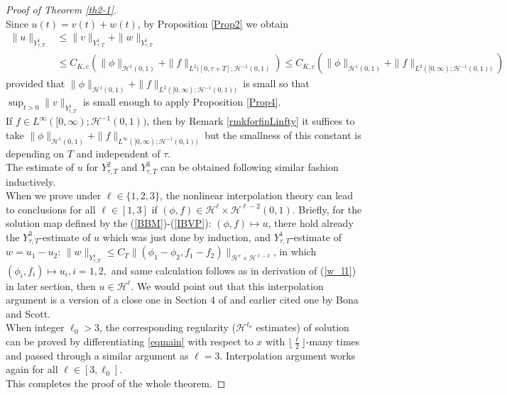 \documentclass[10pt,a4paper,final]{article}
\numberwithin{equation}{section}
\newcommand{\cH}{\mathcal{H}}
\begin{document}
\begin{proof}[Proof of Theorem \ref{th2-1}]\ \\
    Since $u(t)=v(t)+w(t)$, by Proposition \ref{Prop2} we obtain
    \begin{align*}
        \|u\|_{Y^{1}_{\tau,T}}&\leq \|v\|_{Y^{1}_{\tau,T}}+\|w\|_{Y^{1}_{\tau,T}} \\&\leq C_{K,c} (\|\phi\|_{\cH^{1}(0,1)}+\|f\|_{L^2([0,\tau+T];\cH^{-1}(0,1)})\leq C_{K,c}(\|\phi\|_{\cH^{1}(0,1)}+\|f\|_{L^2([0,\infty);\cH^{-1}(0,1))})
    \end{align*}
    provided that $\|\phi\|_{\cH^{1}(0,1)}+\|f\|_{L^2([0,\infty);\cH^{-1}(0,1))}$ is small so that $\sup_{t>0}\|v\|_{Y^{1}_{t,T}}$ is small enough to apply Proposition \ref{Prop4}.  \\

    If $f\in L^{\infty}([0,\infty);\cH^{-1}(0,1))$, then by Remark \ref{rmkforfinLinfty} it suffices to take $\|\phi\|_{\cH^{1}(0,1)}+\|f\|_{L^\infty([0,\infty);\cH^{-1}(0,1))}$ but the smallness of this constant is depending on $T$ and independent of $\tau$.\\

    The estimate of $u$ for $Y^2_{\tau,T}$ and $Y^3_{\tau,T}$ can be obtained following similar fashion inductively. \\

    When we prove under $\ell\in\{1,2,3\}$, the nonlinear interpolation theory can lead to conclusions for all $\ell\in[1, 3]$ if $(\phi,f)\in \cH^{\ell}\times \cH^{\ell-2}(0,1)$. Briefly, for the solution map defined by the (\ref{BBM})-(\ref{IBVP}): $(\phi, f)\mapsto u$, there hold already the $Y^3_{\tau, T}$-estimate of $u$ which was just done by induction, and $Y^1_{\tau, T}$-estimate of $w = u_1-u_2$: $\|w\|_{Y^1_{\tau, T}}\le C_T\|(\phi_1-\phi_2,f_1-f_2)\|_{\cH^{\ell}\times\cH^{\ell-2}}$, in which $(\phi_i,f_i)\mapsto u_i, i=1,2,$ and same calculation follows as in derivation of (\ref{w_l1}) in later section, then $u\in \cH^\ell$. We would point out that this interpolation argument is a version of a close one in Section 4 of \cite{BSZ2} and earlier cited one \cite{BS} by Bona and Scott. \\

    When integer $\ell_0>3$, the corresponding regularity ($\cH^{\ell_0}$ estimates) of solution can be proved by differentiating \eqref{eqmain} with respect to $x$ with $\lfloor \frac{\ell}{2}\rfloor$-many times and passed through a similar argument as $\ell=3$. Interpolation argument works again for all $\ell\in[3, \ell_0].$\\
    
    This completes the proof of the whole theorem.
   
\end{proof} 
\end{document}
